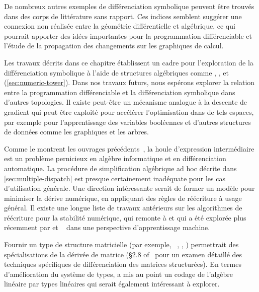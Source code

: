 De nombreux autres exemples de différenciation symbolique peuvent être trouvés dans des corps de littérature sans rapport. Ces indices semblent suggérer une connexion non réalisée entre la géométrie différentielle et algébrique, ce qui pourrait apporter des idées importantes pour la programmation différenciable et l'étude de la propagation des changements sur les graphiques de calcul.

Les travaux décrits dans ce chapitre établissent un cadre pour l'exploration de la différenciation symbolique à l'aide de structures algébriques comme , , et  (\autoref{sec:numeric-tower}). Dans nos travaux futurs, nous espérons explorer la relation entre la programmation différenciable et la différenciation symbolique dans d'autres topologies. Il existe peut-être un mécanisme analogue à la descente de gradient qui peut être exploité pour accélérer l'optimisation dans de tels espaces, par exemple pour l'apprentissage des variables booléennes et d'autres structures de données comme les graphiques et les arbres.

Comme le montrent les ouvrages précédents~\citep{bergstra2010theano, baydin2015survey, laue2019equivalence}, la houle d'expression intermédiaire est un problème pernicieux en algèbre informatique et en différenciation automatique. La procédure de simplification algébrique ad hoc décrite dans \autoref{sec:multiple-dispatch} est presque certainement inadéquate pour les cas d'utilisation générale. Une direction intéressante serait de former un modèle pour minimiser la dérive numérique, en appliquant des règles de réécriture à usage général. Il existe une longue liste de travaux antérieurs sur les algorithmes de réécriture pour la stabilité numérique, qui remonte à \citet{kahan1965summation, dekker1971floating, ogita2005accurate} et qui a été explorée plus récemment par \citet{zaremba2014learning, zaremba2016learning} et ~\citet{wang2019global} dans une perspective d'apprentissage machine.

Fournir un type de structure matricielle (par exemple, \ , , ) permettrait des spécialisations de la dérivée de matrice (\S 2.8 of~\citet{petersen2012matrix} pour un examen détaillé des techniques spécifiques de différenciation des matrices structurées). En termes d'amélioration du système de types, \citet{makwana2018numlin} a mis au point un codage de l'algèbre linéaire par types linéaires qui serait également intéressant à explorer.

